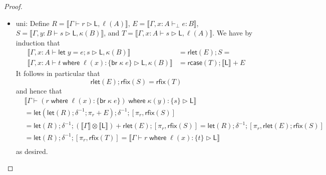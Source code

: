 \documentclass[acmsmall,screen,review]{acmart}
\newcommand{\ms}[1]{\ensuremath{\mathsf{#1}}}
\newcommand{\lto}{:}
\newcommand{\letstmt}[3]{\ensuremath{\ms{let}\;#1 = #2; #3}}
\newcommand{\brb}[2]{\ms{br}\;#1\;#2}
\newcommand{\where}[2]{#1\;\ms{where}\;#2}
\newcommand{\wbranch}[3]{#1(#2) \lto \{#3\}}
\newcommand{\bhyp}[2]{#1 : #2}
\newcommand{\hasty}[4]{#1 \vdash_{#2} #3: {#4}}
\newcommand{\haslb}[3]{#1 \vdash #2 \rhd #3}
\newcommand{\brle}[1]{{\textsf{#1}}}
\newcommand{\dnt}[1]{\llbracket{#1}\rrbracket}
\newcommand{\lmor}[1]{\ms{let}(#1)}
\newcommand{\rlmor}[1]{\ms{rlet}(#1)}
\newcommand{\rcase}[1]{\ms{rcase}(#1)}
\newcommand{\rfix}[1]{\ms{rfix}(#1)}
\begin{document}
\begin{proof}
\begin{itemize}[leftmargin=*]
    \item \brle{uni}: 
    Define $R = \dnt{\haslb{\Gamma}{r}{\ms{L}, \ell(A)}}$, %
           $E = \dnt{\hasty{\Gamma, \bhyp{x}{A}}{\bot}{e}{B}}$, %
           $S = \dnt{\haslb{\Gamma, \bhyp{y}{B}}{s}{\ms{L}, \kappa(B)}}$, and %
           $T = \dnt{\haslb{\Gamma, \bhyp{x}{A}}{s}{\ms{L}, \ell(A)}}$. %
    We have by induction that
    \begin{equation}
      \begin{aligned}
        \dnt{\haslb{\Gamma, \bhyp{x}{A}}{\letstmt{y}{e}{s}}{\ms{L}, \kappa(B)}}
        &= \rlmor{E} ; S = \\
        \dnt{\haslb{\Gamma, \bhyp{x}{A}}
          {\where{t}{\wbranch{\ell}{x}{\brb{\kappa}{e}}}}{\ms{L}, \kappa(B)}}
        &= \rcase{T} ; \dnt{\ms{L}} + E  
      \end{aligned}
    \end{equation}
    It follows in particular that
    \begin{equation}
      \rlmor{E} ; \rfix{S} = \rfix{T}
    \end{equation}
    and hence that
    \begin{equation}
      \begin{aligned}
        & \dnt{
          \haslb{\Gamma}
          {\where{(\where{r}{\wbranch{\ell}{x}{\brb{\kappa}{e}}})}{\wbranch{\kappa}{y}{s}}}
          {\ms{L}}} \\
        & = \lmor{\lmor{R} ; \delta^{-1} ; \pi_r + E}
          ; \delta^{-1} ; [\pi_r, \rfix{S}] \\
        & = \lmor{R} ; \delta^{-1} 
          ; (\dnt{\Gamma} \otimes \dnt{\ms{L}}) + \rlmor{E} 
          ; [\pi_r, \rfix{S}]
          = \lmor{R} ; \delta^{-1}
          ; [\pi_r, \rlmor{E} ; \rfix{S}] \\
        & = \lmor{R} ; \delta^{-1}
          ; [\pi_r, \rfix{T}]
          = \dnt{\haslb{\Gamma}{\where{r}{\wbranch{\ell}{x}{t}}}{\ms{L}}} \\
      \end{aligned}
    \end{equation}
    as desired.
    

\end{itemize}
\end{proof}
\end{document}
